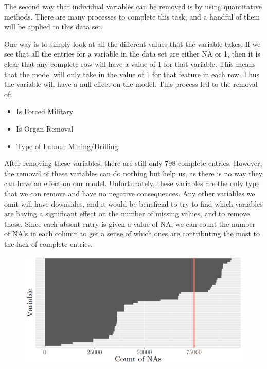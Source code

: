 \documentclass{article} %
\begin{document}
	The second way that individual variables can be removed is by using quantitative methods. There are many processes to complete this task, and a handful of them will be applied to this data set. 
	
	One way is to simply look at all the different values that the variable takes. If we see that all the entries for a variable in the data set are either NA or 1, then it is clear that any complete row will have a value of 1 for that variable. This means that the model will only take in the value of 1 for that feature in each row. Thus the variable will have a null effect on the model. This process led to the removal of:
	

	\begin{multicols}{2}
		\begin{itemize}
			\item Is Forced Military
			\item Is Organ Removal
			\item Type of Labour Mining/Drilling
		\end{itemize}
	\end{multicols}
	
	After removing these variables, there are still only 798 complete entries. However, the removal of these variables can do nothing but help us, as there is no way they can have an effect on our model. Unfortunately, these variables are the only type that we can remove and have no negative consequences. Any other variables we omit will have downsides, and it would be beneficial to try to find which variables are having a significant effect on the number of missing values, and to remove those. Since each absent entry is given a value of NA, we can count the number of NA's in each column to get a sense of which ones are contributing the most to the lack of complete entries.
	
	\begin{figure}[H]
		\includegraphics[width = \textwidth]{NABarplot}
	\end{figure}
	
\end{document}
